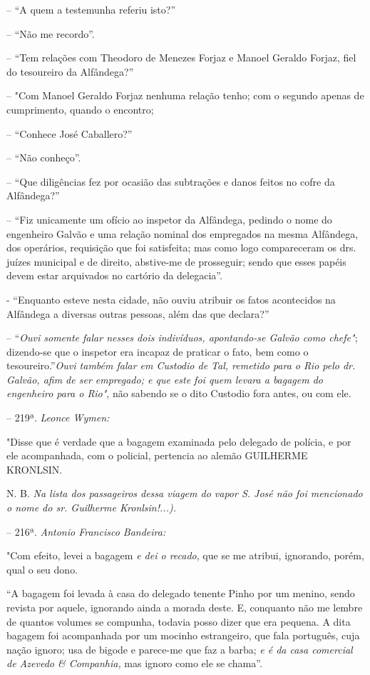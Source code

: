-- ``A quem a testemunha referiu isto?''

-- ``Não me recordo''.

-- ``Tem relações com Theodoro de Menezes Forjaz e Manoel Geraldo
Forjaz, fiel do tesoureiro da Alfândega?''

-- "Com Manoel Geraldo Forjaz nenhuma relação tenho; com o segundo
apenas de cumprimento, quando o encontro;

-- ``Conhece José Caballero?''

-- ``Não conheço''.

-- ``Que diligências fez por ocasião das subtrações e danos feitos no
cofre da Alfândega?''

-- ``Fiz unicamente um ofício ao inspetor da Alfândega, pedindo o nome
do engenheiro Galvão e uma relação nominal dos empregados na mesma
Alfândega, dos operários, requisição que foi satisfeita; mas como logo
compareceram os drs. juízes municipal e de direito, abstive-me de
prosseguir; sendo que esses papéis devem estar arquivados no cartório da
delegacia''.

- ``Enquanto esteve nesta cidade, não ouviu atribuir os fatos
acontecidos na Alfândega a diversas outras pessoas, além das que
declara?''

-- ``\emph{Ouvi somente falar nesses dois indivíduos, apontando-se
Galvão como chefe"}; dizendo-se que o inspetor era incapaz de praticar o
fato, bem como o tesoureiro.''\emph{Ouvi também falar em Custodio de
Tal, remetido para o Rio pelo dr. Galvão, afim de ser empregado; e que
este foi quem levara a bagagem do engenheiro para o Rio"}, não sabendo
se o dito Custodio fora antes, ou com ele.

-- 219ª. \emph{Leonce Wymen:}

"Disse que é verdade que a bagagem examinada pelo delegado de polícia, e
por ele acompanhada, com o policial, pertencia ao alemão GUILHERME
KRONLSIN.

N. B. \emph{Na lista dos passageiros dessa viagem do vapor S. José não
foi mencionado o nome do sr. Guilherme Kronlsin!...).}

-- 216ª. \emph{Antonio Francisco Bandeira:}

"Com efeito, levei a bagagem \emph{e dei o recado}, que se me atribui,
ignorando, porém, qual o seu dono.

``A bagagem foi levada à casa do delegado tenente Pinho por um menino,
sendo revista por aquele, ignorando ainda a morada deste. E, conquanto
não me lembre de quantos volumes se compunha, todavia posso dizer que
era pequena. A dita bagagem foi acompanhada por um mocinho estrangeiro,
que fala português, cuja nação ignoro; usa de bigode e parece-me que faz
a barba; \emph{e é da casa comercial de Azevedo \& Companhia,} mas
ignoro como ele se chama''.

